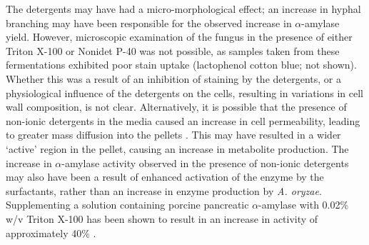 The detergents may have had a micro-morphological effect; an increase in hyphal branching may have been responsible for the observed increase in $\alpha$-amylase yield. However, microscopic examination of the fungus in the presence of either Triton X-100 or Nonidet P-40 was not possible, as samples taken from these fermentations exhibited poor stain uptake (lactophenol cotton blue; not shown). Whether this was a result of an inhibition of staining by the detergents, or a physiological influence of the detergents on the cells, resulting in variations in cell wall composition, is not clear. Alternatively, it is possible that the presence of non-ionic detergents in the media caused an increase in cell permeability, leading to greater mass diffusion into the pellets \cite{domingues2000,znidarsic2000}. This may have resulted in a wider \lq active' region in the pellet, causing an increase in metabolite production. The increase in $\alpha$-amylase activity observed in the presence of non-ionic detergents may also have been a result of enhanced activation of the enzyme by the surfactants, rather than an increase in enzyme production by \emph{A. oryzae}. Supplementing a solution containing porcine pancreatic $\alpha$-amylase with 0.02\% w/v Triton X-100 has been shown to result in an increase in activity of approximately 40\% \cite{yoon2005}.